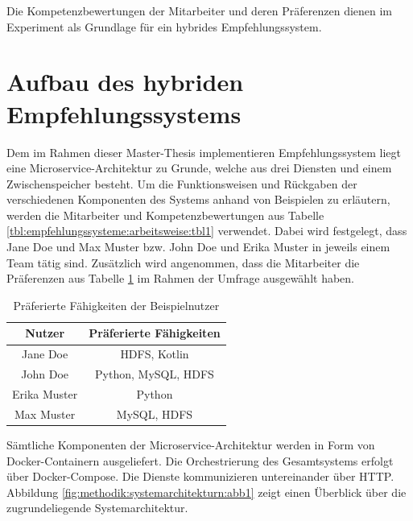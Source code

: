 Die Kompetenzbewertungen der Mitarbeiter und deren Präferenzen dienen im Experiment als Grundlage für ein hybrides Empfehlungssystem.

\section{Aufbau des hybriden Empfehlungssystems}
\label{ch:methodik:versuchsaufbau:systemarchitektur}
Dem im Rahmen dieser Master-Thesis implementieren Empfehlungssystem liegt eine Microservice-Architektur zu Grunde, welche aus drei Diensten und einem Zwischenspeicher besteht. Um die Funktionsweisen und Rückgaben der verschiedenen Komponenten des Systems anhand von Beispielen zu erläutern, werden die Mitarbeiter und Kompetenzbewertungen aus Tabelle \ref{tbl:empfehlungssysteme:arbeitsweise:tbl1} verwendet. Dabei wird festgelegt, dass Jane Doe und Max Muster bzw. John Doe und Erika Muster in jeweils einem Team tätig sind. Zusätzlich wird angenommen, dass die Mitarbeiter die Präferenzen aus Tabelle \ref{tbl:methodik:versuchsaufbau:systemarchitektur:tbl1} im Rahmen der Umfrage ausgewählt haben.

\begin{table}[h]
	\centering
	\begin{tabular}{c|c}
		Nutzer & Präferierte Fähigkeiten\\
		\hline
		Jane Doe     & HDFS, Kotlin\\
		John Doe     & Python, MySQL, HDFS\\
		Erika Muster & Python\\
		Max Muster   & MySQL, HDFS
	\end{tabular}
	\caption{Präferierte Fähigkeiten der Beispielnutzer}
	\label{tbl:methodik:versuchsaufbau:systemarchitektur:tbl1}
\end{table}

Sämtliche Komponenten der Microservice-Architektur werden in Form von Docker-Containern ausgeliefert. Die Orchestrierung des Gesamtsystems erfolgt über Docker-Compose. Die Dienste kommunizieren untereinander über HTTP. Abbildung \ref{fig:methodik:systemarchitekturn:abb1} zeigt einen Überblick über die zugrundeliegende Systemarchitektur.

